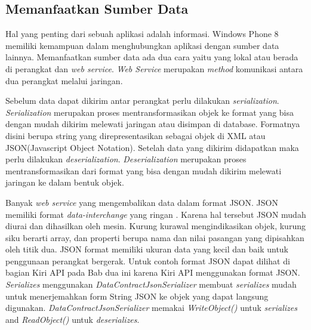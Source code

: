 \subsection{Memanfaatkan Sumber Data}
\label{subsec:Memanfaatkan Sumber Data}
\hspace{0.5cm} Hal yang penting dari sebuah aplikasi adalah informasi. Windows Phone 8 memiliki kemampuan dalam menghubungkan aplikasi dengan sumber data lainnya. Memanfaatkan sumber data ada dua cara yaitu yang lokal atau berada di perangkat dan \textit{web service}. \textit{Web Service} merupakan \textit{method} komunikasi antara dua perangkat melalui jaringan. 

Sebelum data dapat dikirim antar perangkat perlu dilakukan \textit{serialization}. \textit{Serialization} merupakan proses mentransformasikan objek ke format yang bisa dengan mudah dikirim melewati jaringan atau disimpan di database\cite{Manning}. Formatnya disini berupa string yang direpresentasikan sebagai objek di XML atau JSON(Javascript Object Notation). Setelah data yang dikirim didapatkan maka perlu dilakukan \textit{deserialization}. \textit{Deserialization} merupakan proses mentransformasikan dari format yang bisa dengan mudah dikirim melewati jaringan ke dalam bentuk objek. 

Banyak \textit{web service} yang mengembalikan data dalam format JSON. JSON memiliki format \textit{data-interchange} yang ringan \cite{rfc7159}. Karena hal tersebut JSON mudah diurai dan dihasilkan oleh mesin. Kurung kurawal mengindikasikan objek, kurung siku berarti array, dan properti berupa nama dan nilai pasangan yang dipisahkan oleh titik dua. JSON format memiliki ukuran data yang kecil dan baik untuk penggunaan perangkat bergerak. Untuk contoh format JSON dapat dilihat di bagian Kiri API pada Bab dua ini karena Kiri API menggunakan format JSON. \textit{Serializes} menggunakan \textit{DataContractJsonSerializer} membuat \textit{serializes} mudah untuk menerjemahkan form String JSON ke objek yang dapat langsung digunakan. \textit{DataContractJsonSerializer} memakai \textit{WriteObject()} untuk \textit{serializes} and \textit{ReadObject()} untuk \textit{deserializes}.

